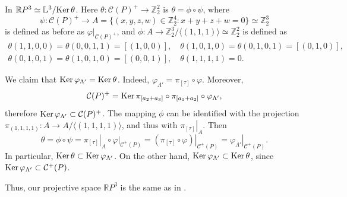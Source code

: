 \documentclass[12pt]{amsart}
\theoremstyle{definition}
\theoremstyle{remark}
\begin{document}
In \cite{VM99S2} $\mathbb RP^3\simeq \mathbb L^3/{\rm Ker}\,\theta$. Here 
$\theta\colon \mathcal{C}(P)^+\to\mathbb Z_2^2$ is $\theta=\phi\circ\psi$, where
$$
\psi\colon \mathcal{C}(P)^+\to A=\{(x,y,z,w)\in \mathbb Z_2^4\colon x+y+z+w=0\}\simeq\mathbb Z_2^3
$$ 
is defined as before as $\left.\varphi\right|_{\mathcal{C}(P)^+}$, and $\phi\colon A\to\mathbb Z_2^3/\langle(1,1,1)\rangle\simeq \mathbb Z_2^2$ is defined as 
\begin{gather*}
\theta(1,1,0,0)=\theta(0,0,1,1)=[(1,0,0)],\quad \theta(1,0,1,0)=\theta(0,1,0,1)=[(0,1,0)],\\
\theta(0,1,0,1)=\theta(1,0,1,0)=[(0,0,1)],\quad \theta(1,1,1,1)=0.
\end{gather*}

We claim that ${\rm Ker}\,\varphi_{\Lambda'}={\rm Ker}\,\theta$. Indeed, $\varphi_{\Lambda'}=\pi_{[\tau]}\circ\varphi$.
Moreover, 
$$
\mathcal{C}(P)^+={\rm Ker}\,\pi_{[a_2+a_3]}\circ\pi_{[a_1+a_2]}\circ\varphi_{\Lambda'},
$$
therefore ${\rm Ker}\,\varphi_{\Lambda'}\subset \mathcal{C}(P)^+$. 
The mapping $\phi$ can be identified with the projection $\pi_{(1,1,1,1)}\colon A\to A/\langle (1,1,1,1)\rangle$, and thus with $\left.\pi_{[\tau]}\right|_A$.
Then 
$$
\theta=\phi\circ\psi=\left.\pi_{[\tau]}\right|_A\circ\left.\varphi\right|_{\mathcal{C}^+(P)}=
\left.(\pi_{[\tau]}\circ \varphi)\right|_{\mathcal{C}^+(P)}=\left.\varphi_{\Lambda'}\right|_{\mathcal{C}^+(P)}.
$$
In particular,  ${\rm Ker}\,\theta\subset{\rm Ker}\,\varphi_{\Lambda'}$. On the other hand,  
${\rm Ker}\,\varphi_{\Lambda'}\subset{\rm Ker}\,\theta$,
since ${\rm Ker}\,\varphi_{\Lambda'}\subset \mathcal{C}^+(P)$.

Thus, our projective space $\mathbb RP^3$ is the same as in \cite{VM99S2}.
\end{document}

